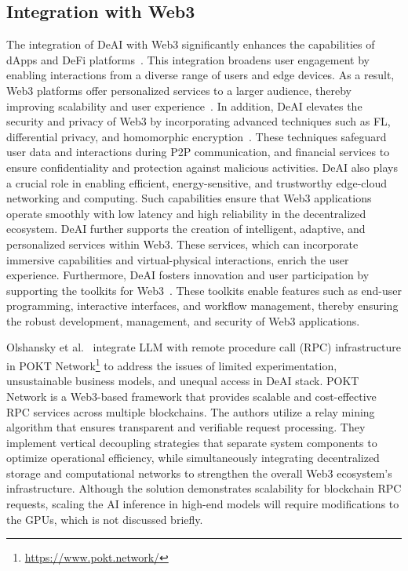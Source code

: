 \documentclass[5p,twocolumn]{elsarticle}
\begin{document}
\subsection{Integration with Web3}
The integration of DeAI with Web3 significantly enhances the capabilities of dApps and DeFi platforms~\cite{cao2022decentralized,ray2023web3}. This integration broadens user engagement by enabling interactions from a diverse range of users and edge devices. As a result, Web3 platforms offer personalized services to a larger audience, thereby improving scalability and user experience~\cite{kersic2024review}. In addition, DeAI elevates the security and privacy of Web3 by incorporating advanced techniques such as FL, differential privacy, and homomorphic encryption~\cite{huang2024web3}. These techniques safeguard user data and interactions during P2P communication, and financial services to ensure confidentiality and protection against malicious activities. DeAI also plays a crucial role in enabling efficient, energy-sensitive, and trustworthy edge-cloud networking and computing. Such capabilities ensure that Web3 applications operate smoothly with low latency and high reliability in the decentralized ecosystem. DeAI further supports the creation of intelligent, adaptive, and personalized services within Web3. These services, which can incorporate immersive capabilities and virtual-physical interactions, enrich the user experience. Furthermore, DeAI fosters innovation and user participation by supporting the toolkits for Web3~\cite{allen2023web3}. These toolkits enable features such as end-user programming, interactive interfaces, and workflow management, thereby ensuring the robust development, management, and security of Web3 applications.

Olshansky et al.~\cite{olshansky2024decentralized} integrate LLM with remote procedure call (RPC) infrastructure in POKT Network\footnote{\url{https://www.pokt.network/}} to address the issues of limited experimentation, unsustainable business models, and unequal access in DeAI stack. POKT Network is a Web3-based framework that provides scalable and cost-effective RPC services across multiple blockchains. The authors utilize a relay mining algorithm that ensures transparent and verifiable request processing. They implement vertical decoupling strategies that separate system components to optimize operational efficiency, while simultaneously integrating decentralized storage and computational networks to strengthen the overall Web3 ecosystem's infrastructure. Although the solution demonstrates scalability for blockchain RPC requests, scaling the AI inference in high-end models will require modifications to the GPUs, which is not discussed briefly.
\end{document}
